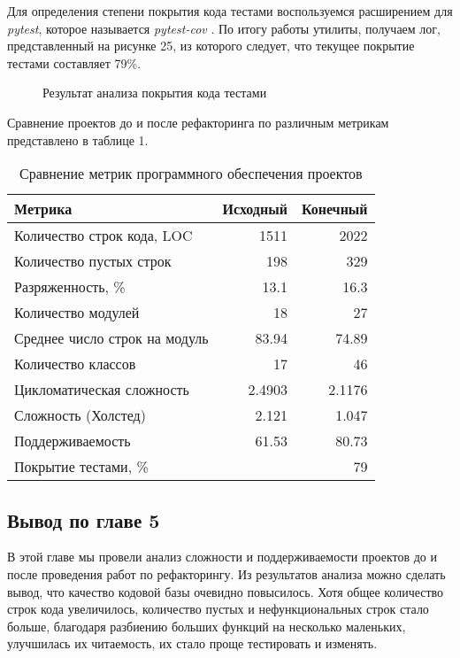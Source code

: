     Для определения степени покрытия кода тестами воспользуемся расширением для
    \textit{pytest}, которое называется \textit{pytest-cov}
    \cite{test.pytest.cov}.
    По итогу работы утилиты, получаем лог, представленный на рисунке 25,
    из которого следует, что текущее покрытие тестами составляет 79\%.
    \begin{figure}[H]
        \centering
        
        \caption{Результат анализа покрытия кода тестами}
        \label{fig:pytest-coverage}
    \end{figure}
    \newpage

    Сравнение проектов до и после рефакторинга по различным метрикам представлено в таблице 1.
    \begin{table}[H]
        \caption{Сравнение метрик программного обеспечения проектов}
        \begin{center}
            \begin{tabular}{l|r|r}
                \textbf{Метрика} & \textbf{Исходный} & \textbf{Конечный} \\
                \hline
                Количество строк кода, LOC    & 1511    & 2022 \\
                Количество пустых строк       & 198     & 329 \\
                Разряженность, \%             & 13.1    & 16.3 \\
                Количество модулей            & 18      & 27 \\
                Среднее число строк на модуль & 83.94   & 74.89 \\
                Количество классов            & 17      & 46 \\
                Цикломатическая сложность     & 2.4903  & 2.1176 \\
                Сложность (Холстед)           & 2.121   & 1.047 \\
                Поддерживаемость              & 61.53   & 80.73 \\
                Покрытие тестами, \%          &         & 79 \\
            \end{tabular}
        \end{center}
    \end{table}

    \subsection*{Вывод по главе 5}
    В этой главе мы провели анализ сложности и поддерживаемости проектов
    до и после проведения работ по рефакторингу. Из результатов анализа
    можно сделать вывод, что качество кодовой базы очевидно повысилось.
    Хотя общее количество строк кода увеличилось, количество пустых и
    нефункциональных строк стало больше, благодаря разбиению больших функций
    на несколько маленьких, улучшилась их читаемость, их стало проще тестировать
    и изменять.

